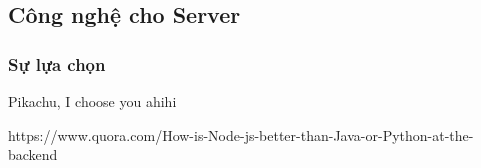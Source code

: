 \subsection{Công nghệ cho Server}



\subsubsection{Sự lựa chọn}
Pikachu, I choose you
ahihi

https://www.quora.com/How-is-Node-js-better-than-Java-or-Python-at-the-backend